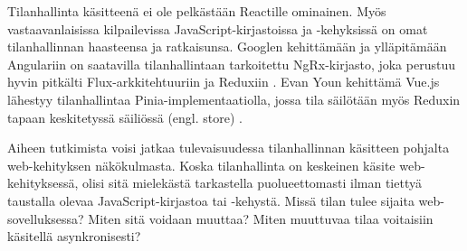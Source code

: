 Tilanhallinta käsitteenä ei ole pelkästään Reactille ominainen. Myös vastaavanlaisissa kilpailevissa JavaScript-kirjastoissa ja -kehyksissä on omat tilanhallinnan haasteensa ja ratkaisunsa. Googlen kehittämään ja ylläpitämään Angulariin on saatavilla tilanhallintaan tarkoitettu NgRx-kirjasto, joka perustuu hyvin pitkälti Flux-arkkitehtuuriin ja Reduxiin \cite{ngrx}. Evan Youn kehittämä Vue.js lähestyy tilanhallintaa Pinia-implementaatiolla, jossa tila säilötään myös Reduxin tapaan keskitetyssä säiliössä (engl. store) \cite{pinia}.

Aiheen tutkimista voisi jatkaa tulevaisuudessa tilanhallinnan käsitteen pohjalta web-kehityksen näkökulmasta. Koska tilanhallinta on keskeinen käsite web-kehityksessä, olisi sitä mielekästä tarkastella puolueettomasti ilman tiettyä taustalla olevaa JavaScript-kirjastoa tai -kehystä. Missä tilan tulee sijaita web-sovelluksessa? Miten sitä voidaan muuttaa? Miten muuttuvaa tilaa voitaisiin käsitellä asynkronisesti?

%
%
%
